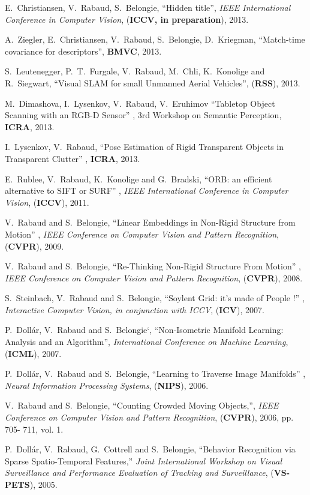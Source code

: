 E.~Christiansen, V.~Rabaud, S.~Belongie, ``Hidden title'', {\em IEEE 
International Conference in Computer Vision}, (\textbf{ICCV, in preparation}), 2013.

A.~Ziegler, E.~Christiansen, V.~Rabaud, S.~Belongie, D.~Kriegman, ``Match-time covariance for 
descriptors'', \textbf{BMVC}, 2013.

S.~Leutenegger, P.~T.~Furgale, V.~Rabaud, M.~Chli, K.~Konolige and R.~Siegwart, ``Visual SLAM for small Unmanned 
Aerial Vehicles'', (\textbf{RSS}), 2013.

M.~Dimashova, I.~Lysenkov, V.~Rabaud, V.~Eruhimov ``Tabletop Object Scanning with an RGB-D Sensor'' , 3rd Workshop 
on Semantic Perception, \textbf{ICRA}, 2013.

I.~Lysenkov, V.~Rabaud, ``Pose Estimation of Rigid Transparent Objects in Transparent Clutter'' , \textbf{ICRA}, 2013.

E.~Rublee, V.~Rabaud, K.~Konolige and G.~Bradski, ``ORB: an efficient alternative to SIFT or SURF'' , {\em IEEE 
International Conference in Computer Vision}, (\textbf{ICCV}), 2011.

V.~Rabaud and S.~Belongie, ``Linear Embeddings in Non-Rigid Structure from Motion'' , {\em IEEE Conference on Computer 
Vision and Pattern Recognition}, (\textbf{CVPR}), 2009.

V.~Rabaud and S.~Belongie, ``Re-Thinking Non-Rigid Structure From Motion'' , {\em IEEE Conference on Computer Vision and 
Pattern Recognition}, (\textbf{CVPR}), 2008.

S.~Steinbach, V.~Rabaud and S.~Belongie, ``Soylent Grid: it's made of People !'' , {\em Interactive Computer Vision, in 
conjunction with ICCV}, (\textbf{ICV}), 2007.

P.~Doll\'ar, V.~Rabaud and S.~Belongie`, ``Non-Isometric Manifold Learning: Analysis and an Algorithm'', {\em 
International Conference on Machine Learning}, (\textbf{ICML}), 2007.

P.~Doll\'ar, V.~Rabaud and S.~Belongie, ``Learning to Traverse Image Manifolds'' , {\em Neural Information Processing 
Systems}, (\textbf{NIPS}), 2006. 

V.~Rabaud and S.~Belongie, ``Counting Crowded Moving Objects,'', {\em IEEE Conference on Computer Vision and Pattern 
Recognition}, (\textbf{CVPR}), 2006, pp. 705- 711, vol. 1.

P.~Doll\'ar, V.~Rabaud, G.~Cottrell and S.~Belongie, ``Behavior Recognition via Sparse Spatio-Temporal Features,'' {\em 
Joint International Workshop on Visual Surveillance and Performance Evaluation of Tracking and Surveillance}, 
(\textbf{VS-PETS}), 2005. 

